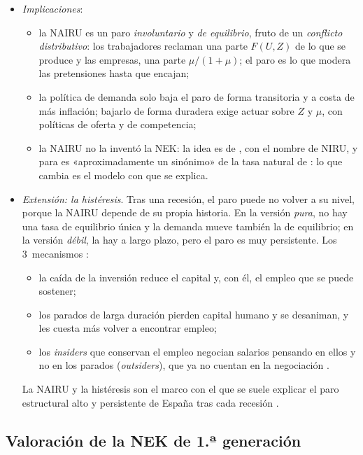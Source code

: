 \documentclass[11pt]{article}
\begin{document}
\begin{itemize}
\item \emph{Implicaciones}:
  \begin{itemize}
  \item la NAIRU es un paro \emph{involuntario} y \emph{de equilibrio}, fruto de un \emph{conflicto distributivo}: los trabajadores reclaman una parte $F(U,Z)$ de lo que se produce y las empresas, una parte $\mu/(1+\mu)$; el paro es lo que modera las pretensiones hasta que encajan;
  \item la política de demanda solo baja el paro de forma transitoria y a costa de más inflación; bajarlo de forma duradera exige actuar sobre $Z$ y $\mu$, con políticas de oferta y de competencia;
  \item la NAIRU no la inventó la NEK: la idea es de \textcite{ModiglianiPapademos1975Targets}, con el nombre de NIRU, y para \textcite{BallMankiw2002NAIRU} es «aproximadamente un sinónimo» de la tasa natural de : lo que cambia es el modelo con que se explica.
  \end{itemize}
\item \emph{Extensión: la histéresis}. Tras una recesión, el paro puede no volver a su nivel, porque la NAIRU depende de su propia historia\nocite{BlanchardSummers1986Hysteresis}. En la versión \emph{pura}, no hay una tasa de equilibrio única y la demanda mueve también la de equilibrio; en la versión \emph{débil}, la hay a largo plazo, pero el paro es muy persistente. Los 3~mecanismos :
  \begin{itemize}
  \item la caída de la inversión reduce el capital y, con él, el empleo que se puede sostener;
  \item los parados de larga duración pierden capital humano y se desaniman, y les cuesta más volver a encontrar empleo;
  \item los \emph{insiders} que conservan el empleo negocian salarios pensando en ellos y no en los parados (\emph{outsiders}), que ya no cuentan en la negociación\nocite{LindbeckSnower1986Wage,LindbeckSnower1988Insider} .
  \end{itemize}
  La NAIRU y la histéresis son el marco con el que se suele explicar el paro estructural alto y persistente de España tras cada recesión .
\end{itemize}

\subsection{Valoración de la NEK de 1.ª generación}\label{sec:valoracion-primera}
\end{document}
